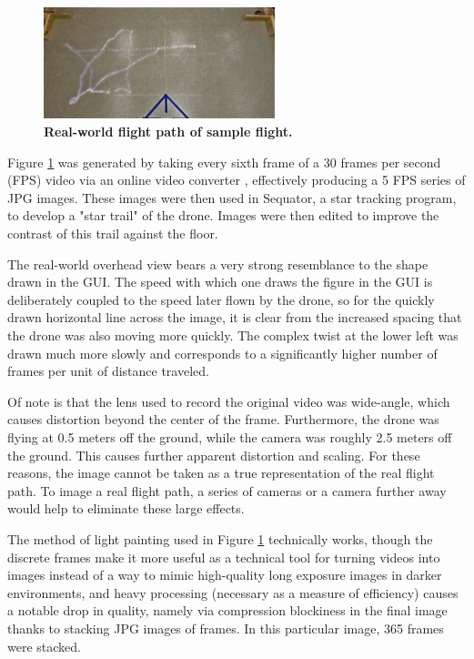 \documentclass[conf]{new-aiaa}
\begin{document}
        \begin{figure}[H]
        \centering
        \includegraphics[width=0.6\textwidth]{docs/reports/Final Project Update/images/real_flight_path.png}
        \caption{\textbf{Real-world flight path of sample flight.}}
        \label{fig:real_flight}
        \end{figure}
        
        Figure \ref{fig:real_flight} was generated by taking every sixth frame of a 30 frames per second (FPS) video via an online video converter \cite{ezgif}, effectively producing a 5 FPS series of JPG images. These images were then used in Sequator, a star tracking program, to develop a "star trail" of the drone. Images were then edited to improve the contrast of this trail against the floor.
        
        The real-world overhead view bears a very strong resemblance to the shape drawn in the GUI. The speed with which one draws the figure in the GUI is deliberately coupled to the speed later flown by the drone, so for the quickly drawn horizontal line across the image, it is clear from the increased spacing that the drone was also moving more quickly. The complex twist at the lower left was drawn much more slowly and corresponds to a significantly higher number of frames per unit of distance traveled.
        
        Of note is that the lens used to record the original video was wide-angle, which causes distortion beyond the center of the frame. Furthermore, the drone was flying at 0.5 meters off the ground, while the camera was roughly 2.5 meters off the ground. This causes further apparent distortion and scaling. For these reasons, the image cannot be taken as a true representation of the real flight path. To image a real flight path, a series of cameras or a camera further away would help to eliminate these large effects.
        
        The method of light painting used in Figure \ref{fig:real_flight} technically works, though the discrete frames make it more useful as a technical tool for turning videos into images instead of a way to mimic high-quality long exposure images in darker environments, and heavy processing (necessary as a measure of efficiency) causes a notable drop in quality, namely via compression blockiness in the final image thanks to stacking JPG images of frames. In this particular image, 365 frames were stacked.
        
\end{document}
